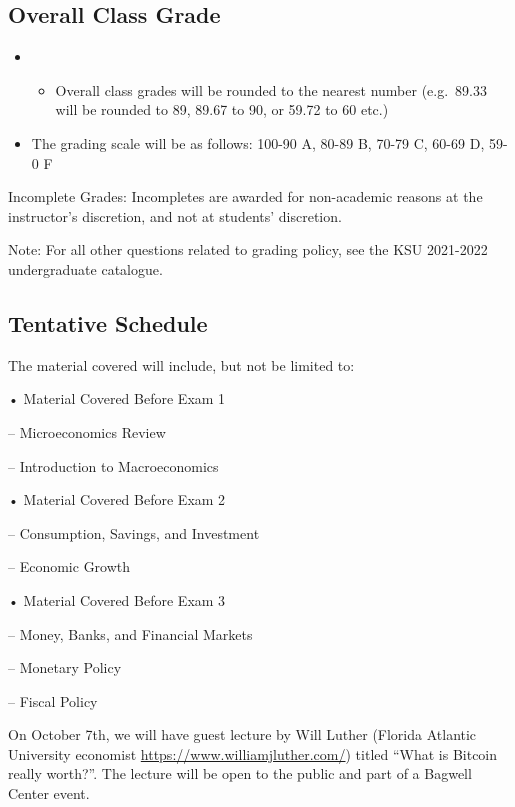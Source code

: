 \documentclass[11pt,]{article}
\providecommand{\tightlist}{%
  \setlength{\itemsep}{0pt}\setlength{\parskip}{0pt}}
\begin{document}
\hypertarget{overall-class-grade}{%
\subsection{Overall Class Grade}\label{overall-class-grade}}

\begin{itemize}
\item
  \begin{itemize}
  \tightlist
  \item
    Overall class grades will be rounded to the nearest number (e.g.~89.33 will be rounded to 89, 89.67 to
    90, or 59.72 to 60 etc.)
  \end{itemize}
\item
  The grading scale will be as follows: 100-90 A, 80-89 B, 70-79 C, 60-69 D, 59-0 F
\end{itemize}

Incomplete Grades: Incompletes are awarded for non-academic reasons at the instructor's discretion, and
not at students' discretion.

Note: For all other questions related to grading policy, see the KSU 2021-2022 undergraduate catalogue.
\newpage

\hypertarget{tentative-schedule}{%
\subsection*{Tentative Schedule}\label{tentative-schedule}}

The material covered will include, but not be limited to:

• Material Covered Before Exam 1

-- Microeconomics Review

-- Introduction to Macroeconomics

• Material Covered Before Exam 2

-- Consumption, Savings, and Investment

-- Economic Growth

• Material Covered Before Exam 3

-- Money, Banks, and Financial Markets

-- Monetary Policy

-- Fiscal Policy

On October 7th, we will have guest lecture by Will Luther (Florida Atlantic University economist \url{https://www.williamjluther.com/}) titled ``What is Bitcoin really worth?''. The lecture will be open to the public and part of a Bagwell Center event.
\end{document}
